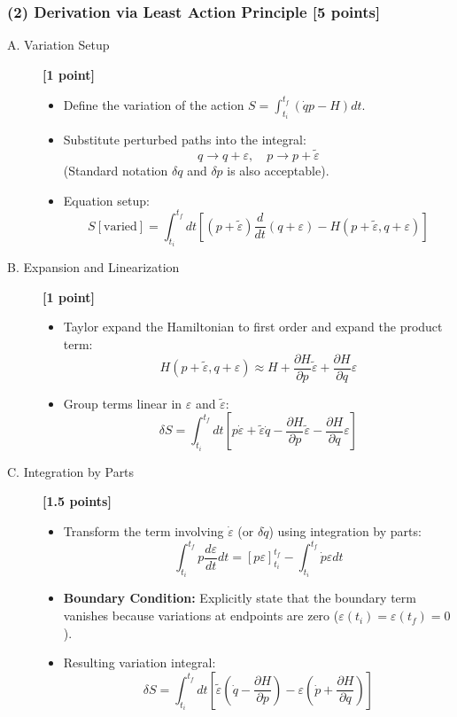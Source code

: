 \documentclass[11pt, a4paper]{article} %
\begin{document}
\subsubsection*{(2) Derivation via Least Action Principle [5 points]}
\begin{description}
    \item[A. Variation Setup] \hfill \textbf{[1 point]}
    \begin{itemize}
        \item Define the variation of the action $S = \int_{t_i}^{t_f} (\dot{q}p - H) dt$.
        \item Substitute perturbed paths into the integral:
        $$ q \to q + \varepsilon, \quad p \to p + \tilde{\varepsilon} $$
        (Standard notation $\delta q$ and $\delta p$ is also acceptable).
        \item Equation setup:
        $$ S[\text{varied}] = \int_{t_i}^{t_f} dt \left[ (p+\tilde{\varepsilon})\frac{d}{dt}(q+\varepsilon) - H(p+\tilde{\varepsilon}, q+\varepsilon) \right] $$
    \end{itemize}

    \item[B. Expansion and Linearization] \hfill \textbf{[1 point]}
    \begin{itemize}
        \item Taylor expand the Hamiltonian to first order and expand the product term:
        $$ H(p+\tilde{\varepsilon}, q+\varepsilon) \approx H + \frac{\partial H}{\partial p}\tilde{\varepsilon} + \frac{\partial H}{\partial q}\varepsilon $$
        \item Group terms linear in $\varepsilon$ and $\tilde{\varepsilon}$:
        $$ \delta S = \int_{t_i}^{t_f} dt \left[ p\dot{\varepsilon} + \tilde{\varepsilon}\dot{q} - \frac{\partial H}{\partial p}\tilde{\varepsilon} - \frac{\partial H}{\partial q}\varepsilon \right] $$
    \end{itemize}

    \item[C. Integration by Parts] \hfill \textbf{[1.5 points]}
    \begin{itemize}
        \item Transform the term involving $\dot{\varepsilon}$ (or $\delta \dot{q}$) using integration by parts:
        $$ \int_{t_i}^{t_f} p \frac{d\varepsilon}{dt} dt = \left[ p\varepsilon \right]_{t_i}^{t_f} - \int_{t_i}^{t_f} \dot{p} \varepsilon dt $$
        \item \textbf{Boundary Condition:} Explicitly state that the boundary term vanishes because variations at endpoints are zero ($\varepsilon(t_i)=\varepsilon(t_f)=0$).
        \item Resulting variation integral:
        $$ \delta S = \int_{t_i}^{t_f} dt \left[ \tilde{\varepsilon}\left(\dot{q} - \frac{\partial H}{\partial p}\right) - \varepsilon\left(\dot{p} + \frac{\partial H}{\partial q}\right) \right] $$
    \end{itemize}


\end{description}
\end{document}
